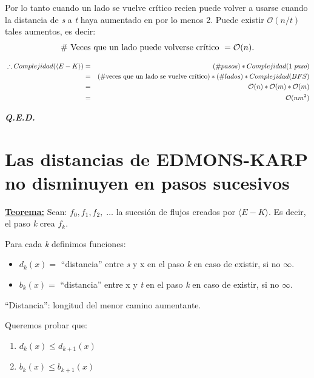 \documentclass[12pt,a4paper]{report}
\newcommand{\QED}{\hfill \textit{\textbf{Q.E.D.}}}
\begin{document}
			\vspace{5mm}
			\par Por lo tanto cuando un lado se vuelve crítico recien puede volver a usarse cuando la distancia de \textit{s} a \textit{t} haya aumentado en por lo menos 2. Puede existir $\mathcal{O}(n/t)$ tales aumentos, es decir:
				\[ \# \textup{ Veces que un lado puede volverse crítico } = \mathcal{O}(n). \]

			\begin{eqnarray}
				\nonumber \; \therefore Complejidad(\langle E-K\rangle) &=& (\# pasos) * Complejidad(1 \; \textit{paso}) \\
				\nonumber &=& (\# \textup{veces que un lado se vuelve crítico}) * (\# lados) * Complejidad(BFS) \\
				\nonumber  &=& \mathcal{O}(n) * \mathcal{O}(m)* \mathcal{O}(m) \\
				\nonumber &=& \mathcal{O}(nm^{2})
			\end{eqnarray}

		\QED

	\pagebreak
	\section{Las distancias de EDMONS-KARP no disminuyen en pasos sucesivos}
		\textbf{\underline{Teorema:}} Sean: $f_{0}, f_{1}, f_{2}, \; \dotsc$ \; la sucesión de flujos creados por $\langle E-K\rangle$. Es decir, el paso \textit{k} crea $f_{k}$.

			\vspace{5mm}
			\par Para cada \textit{k} definimos funciones:

			\begin{itemize}
				\item $d_{k}(x) =$ \textquotedblleft distancia\textquotedblright \; entre \textit{s} y x en el paso \textit{k} en caso de existir, si no $\infty$.
				\item $b_{k}(x) =$ \textquotedblleft distancia\textquotedblright \; entre x y \textit{t} en el paso \textit{k} en caso de existir, si no $\infty$.
			\end{itemize}

			\textquotedblleft Distancia\textquotedblright: longitud del menor camino aumentante.

			\vspace{5mm}
			\par Queremos probar que:
			\begin{enumerate}
				\item $d_{k}(x) \leq d_{k + 1}(x)$
				\item $b_{k}(x) \leq b_{k + 1}(x)$
			\end{enumerate}
\end{document}
